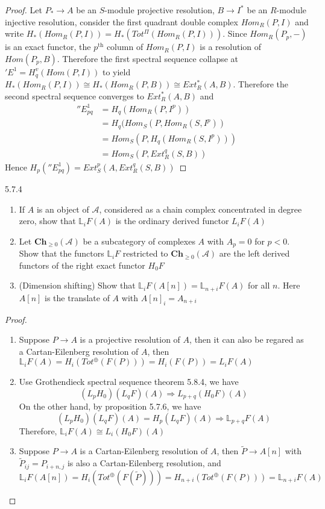 \documentclass[../main.tex]{subfiles}
\begin{document}
\begin{proof}
Let $P_*\to A$ be an $S$-module projective resolution, $B\to I^*$ be an $R$-module injective resolution, consider the first quadrant double complex $Hom_R(P,I)$ and write $H_*(Hom_R(P,I))=H_*(Tot^{\Pi}(Hom_R(P,I)))$. Since $Hom_R(P_p,-)$ is an exact functor, the $p^\text{th}$ column of $Hom_R(P,I)$ is a resolution of $Hom(P_p,B)$. Therefore the first spectral sequence collapse at $'E^1=H^v_q(Hom(P,I))$ to yield $H_*(Hom_R(P,I))\cong H_*(Hom_R(P,B))\cong Ext_R^*(A,B)$. Therefore the second spectral sequence converges to $Ext_R^*(A,B)$ and
\begin{align*}
''E^1_{pq}&=H_q(Hom_R(P,I^p)) \\
&=H_q(Hom_S(P,Hom_R(S,I^p)) \\
&=Hom_S(P,H_q(Hom_R(S,I^p))) \\
&=Hom_S(P,Ext_R^q(S,B))
\end{align*}
Hence $H_p(''E^1_{pq})=Ext_S^p(A,Ext_R^q(S,B))$
\end{proof}

\begin{customexercise}{5.7.4} \hfill
\begin{enumerate}[label=\textbf{\arabic*.}, leftmargin=*]
\item If $A$ is an object of $\mathcal A$, considered as a chain complex concentrated in degree zero, show that $\mathbb L_iF(A)$ is the ordinary derived functor $L_iF(A)$
\item Let $\mathbf{Ch}_{\geq0}(\mathcal A)$ be a subcategory of complexes $A$ with $A_p=0$ for $p<0$. Show that the functors $\mathbb L_iF$ restricted to $\mathbf{Ch}_{\geq0}(\mathcal A)$ are the left derived functors of the right exact functor $H_0F$
\item (Dimension shifting)
Show that $\mathbb L_iF(A[n])=\mathbb L_{n+i}F(A)$ for all $n$. Here $A[n]$ is the translate of $A$ with $A[n]_i=A_{n+i}$
\end{enumerate}
\end{customexercise}

\begin{proof} \hfill
\begin{enumerate}[label=\textbf{\arabic*.}, leftmargin=*]
\item Suppose $P\to A$ is a projective resolution of $A$, then it can also be regared as a Cartan-Eilenberg resolution of $A$, then $\mathbb L_iF(A)=H_i(Tot^\oplus(F(P)))=H_i(F(P))=L_iF(A)$
\item Use Grothendieck spectral sequence theorem 5.8.4, we have
\[(L_pH_0)(L_qF)(A)\Rightarrow L_{p+q}(H_0F)(A)\]
On the other hand, by proposition 5.7.6, we have
\[(L_pH_0)(L_qF)(A)=H_p(L_qF)(A)\Rightarrow\mathbb L_{p+q}F(A)\]
Therefore, $\mathbb L_iF(A)\cong L_i(H_0F)(A)$
\item Suppose $P\to A$ is a Cartan-Eilenberg resolution of $A$, then $\tilde P\to A[n]$ with $\tilde P_{ij}=P_{i+n,j}$ is also a Cartan-Eilenberg resolution, and
\[\mathbb L_iF(A[n])=H_i(Tot^\oplus(F(\tilde P)))=H_{n+i}(Tot^\oplus(F(P)))=\mathbb L_{n+i}F(A)\]
\end{enumerate}
\end{proof}
\end{document}
